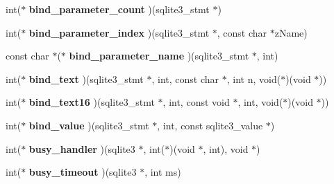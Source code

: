 \begin{DoxyCompactItemize}
\item 
\mbox{\label{structsqlite3__api__routines_acd345a944505eb7928568f01d7a4fe5a}} 
int($\ast$ {\bfseries bind\+\_\+parameter\+\_\+count} )(sqlite3\+\_\+stmt $\ast$)
\item 
\mbox{\label{structsqlite3__api__routines_af4ade5152fd51b1311463014b48dd05d}} 
int($\ast$ {\bfseries bind\+\_\+parameter\+\_\+index} )(sqlite3\+\_\+stmt $\ast$, const char $\ast$z\+Name)
\item 
\mbox{\label{structsqlite3__api__routines_a9d8e99fd21fd5929fc6c254060d8f83b}} 
const char $\ast$($\ast$ {\bfseries bind\+\_\+parameter\+\_\+name} )(sqlite3\+\_\+stmt $\ast$, int)
\item 
\mbox{\label{structsqlite3__api__routines_a0b489499ca3b7e212d25ea8a86d38f0e}} 
int($\ast$ {\bfseries bind\+\_\+text} )(sqlite3\+\_\+stmt $\ast$, int, const char $\ast$, int n, void($\ast$)(void $\ast$))
\item 
\mbox{\label{structsqlite3__api__routines_ab6ad28704caf8337cf5a395154e8941c}} 
int($\ast$ {\bfseries bind\+\_\+text16} )(sqlite3\+\_\+stmt $\ast$, int, const void $\ast$, int, void($\ast$)(void $\ast$))
\item 
\mbox{\label{structsqlite3__api__routines_a8f3424b59d6bbc836c233a44a2fd9a36}} 
int($\ast$ {\bfseries bind\+\_\+value} )(sqlite3\+\_\+stmt $\ast$, int, const sqlite3\+\_\+value $\ast$)
\item 
\mbox{\label{structsqlite3__api__routines_ad7b688e04d388cdeb13d4c06fedb1c46}} 
int($\ast$ {\bfseries busy\+\_\+handler} )(sqlite3 $\ast$, int($\ast$)(void $\ast$, int), void $\ast$)
\item 
\mbox{\label{structsqlite3__api__routines_a8a4a2ccc0c7587e6c5c4db5f4b03246b}} 
int($\ast$ {\bfseries busy\+\_\+timeout} )(sqlite3 $\ast$, int ms)
\item 
\mbox{\label{structsqlite3__api__routines_aef4d7748f5708731e0aaf54dbfbbec33}} 

\end{DoxyCompactItemize}
